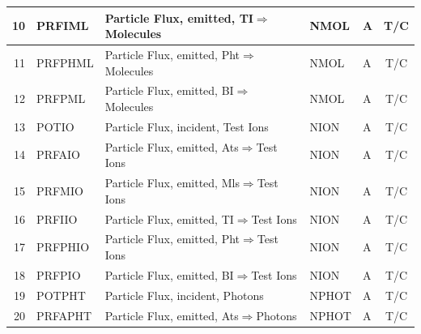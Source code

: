 \begin{landscape}
\begin{longtable}{|r|l|l|l|l|c|}
    \hline
    10                       & PRFIML                 & Particle Flux, emitted,
    \ac{TI}$\Rightarrow$Molecules   & NMOL                   & \si{\ampere}                  & T/C
    \\
    \hline
    11                       & PRFPHML                & Particle Flux, emitted,
    \ac{Pht}$\Rightarrow$Molecules   & NMOL                   & \si{\ampere}                  & T/C
    \\
    \hline
    12                       & PRFPML                 & Particle Flux, emitted,
    \ac{BI}$\Rightarrow$Molecules   & NMOL                   & \si{\ampere}                  & T/C
    \\
    \hline
    13                       & POTIO                  & Particle Flux, incident,
    Test Ions                & NION
                             & \si{\ampere}           & T/C
    \\    \hline
    14                       & PRFAIO                 & Particle Flux, emitted,
    \ac{Ats}$\Rightarrow$Test Ions   & NION                   & \si{\ampere}                  & T/C
    \\
    \hline
    15                       & PRFMIO                 & Particle Flux, emitted,
    \ac{Mls}$\Rightarrow$Test Ions   & NION                   & \si{\ampere}                  & T/C
    \\
    \hline
    16                       & PRFIIO                 & Particle Flux, emitted,
    \ac{TI}$\Rightarrow$Test Ions   & NION                   & \si{\ampere}                  & T/C
    \\
    \hline
    17                       & PRFPHIO                & Particle Flux, emitted,
    \ac{Pht}$\Rightarrow$Test Ions   & NION                   & \si{\ampere}                  & T/C
    \\
    \hline
    18                       & PRFPIO                 & Particle Flux, emitted,
    \ac{BI}$\Rightarrow$Test Ions   & NION                   & \si{\ampere}                  & T/C
    \\
    \hline
    19                       & POTPHT                 & Particle Flux, incident,
    Photons                  & NPHOT
                             & \si{\ampere}           & T/C
    \\    \hline
    20                       & PRFAPHT                & Particle Flux, emitted,
    \ac{Ats}$\Rightarrow$Photons     & NPHOT                  & \si{\ampere}                  & T/C
    \\

\end{longtable}
\end{landscape}
